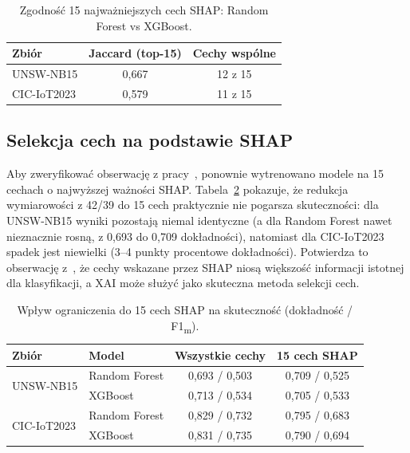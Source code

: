 \documentclass[conference]{IEEEtran}
\begin{document}
\begin{table}[t]
\caption{Zgodność 15 najważniejszych cech SHAP: Random Forest vs XGBoost.}
\label{tab:jaccard}
\centering
\begin{tabular}{lcc}
\toprule
Zbiór & Jaccard (top-15) & Cechy wspólne \\
\midrule
UNSW-NB15   & 0,667 & 12 z 15 \\
CIC-IoT2023 & 0,579 & 11 z 15 \\
\bottomrule
\end{tabular}
\end{table}

\subsection{Selekcja cech na podstawie SHAP}
Aby zweryfikować obserwację z pracy~\cite{arreche2024featureselection}, ponownie wytrenowano modele na 15 cechach o najwyższej ważności SHAP. Tabela~\ref{tab:top15} pokazuje, że redukcja wymiarowości z 42/39 do 15 cech praktycznie nie pogarsza skuteczności: dla UNSW-NB15 wyniki pozostają niemal identyczne (a dla Random Forest nawet nieznacznie rosną, z 0,693 do 0,709 dokładności), natomiast dla CIC-IoT2023 spadek jest niewielki (3--4 punkty procentowe dokładności). Potwierdza to obserwację z~\cite{arreche2024featureselection}, że cechy wskazane przez SHAP niosą większość informacji istotnej dla klasyfikacji, a XAI może służyć jako skuteczna metoda selekcji cech.

\begin{table}[t]
\caption{Wpływ ograniczenia do 15 cech SHAP na skuteczność (dokładność / F1\textsubscript{m}).}
\label{tab:top15}
\centering
\begin{tabular}{llcc}
\toprule
Zbiór & Model & Wszystkie cechy & 15 cech SHAP \\
\midrule
\multirow{2}{*}{UNSW-NB15}
 & Random Forest & 0,693 / 0,503 & 0,709 / 0,525 \\
 & XGBoost       & 0,713 / 0,534 & 0,705 / 0,533 \\
\midrule
\multirow{2}{*}{CIC-IoT2023}
 & Random Forest & 0,829 / 0,732 & 0,795 / 0,683 \\
 & XGBoost       & 0,831 / 0,735 & 0,790 / 0,694 \\
\bottomrule
\end{tabular}
\end{table}
\end{document}
